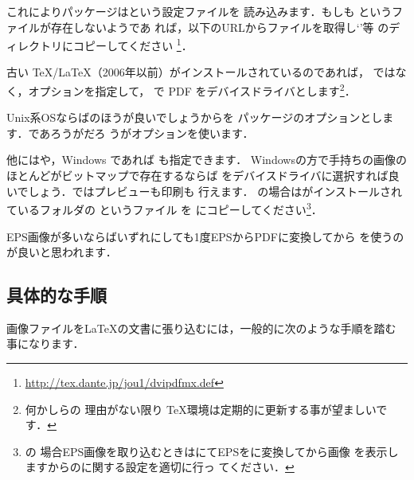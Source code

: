 \begin{InText}
\usepackage[dvipdfmx]{graphicx}
\end{InText}

これによりパッケージはという設定ファイルを
読み込みます．もしも というファイルが存在しないようであ
れば，以下のURLからファイルを取得し`'等
のディレクトリにコピーしてください%
\footnote{\url{http://tex.dante.jp/jou1/dvipdfmx.def}}．


古い \TeX/\LaTeX （2006年以前）がインストールされているのであれば，
ではなく，オプションを指定して，
\Dvipdfmx で PDF をデバイスドライバとします\footnote{何かしらの
理由がない限り \TeX 環境は定期的に更新する事が望ましいです．}．

\begin{InText}
 \usepackage[dvipdfm]{graphicx}
\end{InText}

Unix系OSならば{\PS}のほうが良いでしょうからを
パッケージのオプションとします．であろうがだろ
うがオプションを使います．

他にはや，Windows であれば \Dviout も指定できます．
Windowsの方で手持ちの画像のほとんどがビットマップで存在するならば\Dviout
をデバイスドライバに選択すれば良いでしょう．\Dviout ではプレビューも印刷も
行えます．
\Dviout の場合は\Dviout がインストールされているフォルダの
というファイル
を  にコピーしてください\footnote{\Dviout の
場合EPS画像を取り込むときは\prog{\GS}にてEPSをに変換してから画像
を表示しますから\prog{\Dviout}のに関する設定を適切に行っ
てください．}．

EPS画像が多いならばいずれにしても1度EPSからPDFに変換してから
\prog{\Dvipdfmx}を使うのが良いと思われます．%


\subsection{具体的な手順}

画像ファイルを\LaTeX の文書に張り込むには，一般的に次のような手順を踏む
事になります．

